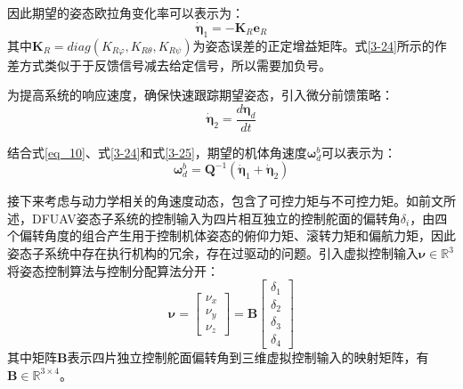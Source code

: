因此期望的姿态欧拉角变化率可以表示为：
\begin{equation}
    \dot{\boldsymbol{\eta}}_1=-\boldsymbol{K}_R\boldsymbol{e}_R
    \label{3-24}
\end{equation}
其中$\boldsymbol{K}_R=diag({K}_{R\varphi},{K}_{R\theta},{K}_{R\psi})$为姿态误差的正定增益矩阵。式\eqref{3-24}所示的作差方式类似于于反馈信号减去给定信号，所以需要加负号。

为提高系统的响应速度，确保快速跟踪期望姿态，引入微分前馈策略：
\begin{equation}
    \dot{\boldsymbol{\eta}}_2=\frac{d\boldsymbol{\eta}_d}{dt}
    \label{3-25}
\end{equation}

结合式\eqref{eq_10}、式\eqref{3-24}和式\eqref{3-25}，期望的机体角速度$\boldsymbol\omega^{b}_d$可以表示为：
\begin{equation}
    \boldsymbol{\omega}^{b}_d=\boldsymbol{Q}^{-1}( \dot{\boldsymbol{\eta}}_1+ \dot{\boldsymbol{\eta}}_2)
    \label{3-26}
\end{equation}

接下来考虑与动力学相关的角速度动态，包含了可控力矩与不可控力矩。如前文所述，DFUAV姿态子系统的控制输入为四片相互独立的控制舵面的偏转角$\delta_i$，由四个偏转角度的组合产生用于控制机体姿态的俯仰力矩、滚转力矩和偏航力矩，因此姿态子系统中存在执行机构的冗余，存在过驱动的问题。引入虚拟控制输入$\boldsymbol{\nu}\in\mathbb{R}^3$将姿态控制算法与控制分配算法分开：
\begin{equation}
    \boldsymbol{\nu}=
    \begin{bmatrix}
    {\nu}_x \\ {\nu}_y \\ {\nu}_z
    \end{bmatrix}=\boldsymbol{B}
    \begin{bmatrix}
    \delta_1 \\ \delta_2 \\ \delta_3 \\ \delta_4
    \end{bmatrix}
    \label{3-27}
\end{equation}
其中矩阵$\boldsymbol{B}$表示四片独立控制舵面偏转角到三维虚拟控制输入的映射矩阵，有$\boldsymbol{B}\in\mathbb{R}^{3\times4}$。

